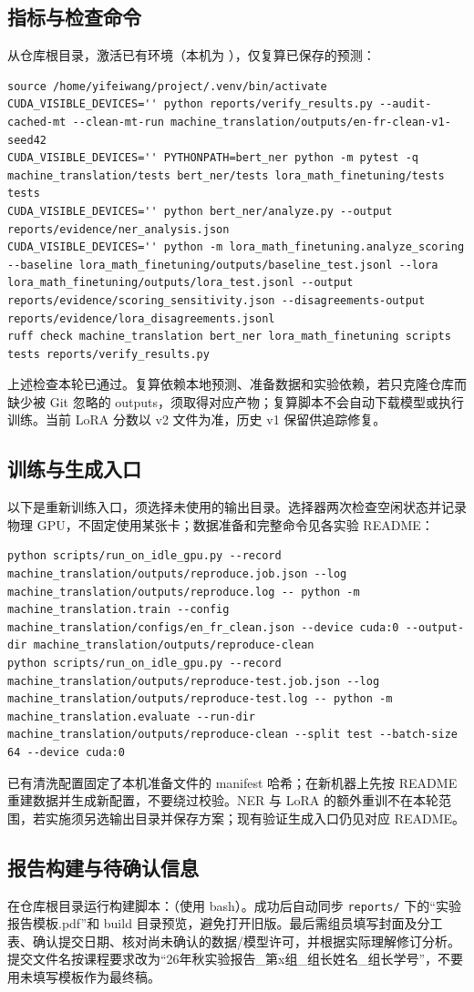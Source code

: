 \documentclass[UTF8,a4paper,12pt,fontset=none]{ctexart}
\begin{document}
\subsection{指标与检查命令}
从仓库根目录，激活已有环境（本机为 ），仅复算已保存的预测：
\begin{Verbatim}[fontsize=\small,breaklines=true]
source /home/yifeiwang/project/.venv/bin/activate
CUDA_VISIBLE_DEVICES='' python reports/verify_results.py --audit-cached-mt --clean-mt-run machine_translation/outputs/en-fr-clean-v1-seed42
CUDA_VISIBLE_DEVICES='' PYTHONPATH=bert_ner python -m pytest -q machine_translation/tests bert_ner/tests lora_math_finetuning/tests tests
CUDA_VISIBLE_DEVICES='' python bert_ner/analyze.py --output reports/evidence/ner_analysis.json
CUDA_VISIBLE_DEVICES='' python -m lora_math_finetuning.analyze_scoring --baseline lora_math_finetuning/outputs/baseline_test.jsonl --lora lora_math_finetuning/outputs/lora_test.jsonl --output reports/evidence/scoring_sensitivity.json --disagreements-output reports/evidence/lora_disagreements.jsonl
ruff check machine_translation bert_ner lora_math_finetuning scripts tests reports/verify_results.py
\end{Verbatim}
上述检查本轮已通过。复算依赖本地预测、准备数据和实验依赖，若只克隆仓库而缺少被 Git 忽略的 outputs，须取得对应产物；复算脚本不会自动下载模型或执行训练。当前 LoRA 分数以 v2 文件为准，历史 v1 保留供追踪修复。

\subsection{训练与生成入口}
以下是重新训练入口，须选择未使用的输出目录。选择器两次检查空闲状态并记录物理 GPU，不固定使用某张卡；数据准备和完整命令见各实验 README：
\begin{Verbatim}[fontsize=\small,breaklines=true]
python scripts/run_on_idle_gpu.py --record machine_translation/outputs/reproduce.job.json --log machine_translation/outputs/reproduce.log -- python -m machine_translation.train --config machine_translation/configs/en_fr_clean.json --device cuda:0 --output-dir machine_translation/outputs/reproduce-clean
python scripts/run_on_idle_gpu.py --record machine_translation/outputs/reproduce-test.job.json --log machine_translation/outputs/reproduce-test.log -- python -m machine_translation.evaluate --run-dir machine_translation/outputs/reproduce-clean --split test --batch-size 64 --device cuda:0
\end{Verbatim}
已有清洗配置固定了本机准备文件的 manifest 哈希；在新机器上先按 README 重建数据并生成新配置，不要绕过校验。NER 与 LoRA 的额外重训不在本轮范围，若实施须另选输出目录并保存方案；现有验证生成入口仍见对应 README。

\subsection{报告构建与待确认信息}
在仓库根目录运行构建脚本：（使用 bash）。成功后自动同步 \texttt{reports/} 下的“实验报告模板.pdf”和 build 目录预览，避免打开旧版。最后需组员填写封面及分工表、确认提交日期、核对尚未确认的数据/模型许可，并根据实际理解修订分析。提交文件名按课程要求改为“26年秋实验报告\_第x组\_组长姓名\_组长学号”，不要用未填写模板作为最终稿。
\end{document}
